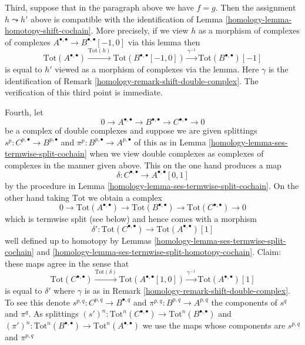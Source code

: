 \begin{remark}
\medskip\noindent
Third, suppose that in the paragraph above we have $f = g$.
Then the assignment $h \leadsto h'$ above is compatible with
the identification of Lemma \ref{homology-lemma-homotopy-shift-cochain}.
More precisely, if we view $h$ as a morphism of complexes
of complexes $A^{\bullet, \bullet} \to B^{\bullet, \bullet}[-1, 0]$
via this lemma then
$$
\text{Tot}(A^{\bullet, \bullet})
\xrightarrow{\text{Tot}(h)}
\text{Tot}(B^{\bullet, \bullet}[-1, 0])
\xrightarrow{\gamma^{-1}}
\text{Tot}(B^{\bullet, \bullet})[-1]
$$
is equal to $h'$ viewed as a morphism of complexes via the lemma.
Here $\gamma$ is the identification of
Remark \ref{homology-remark-shift-double-complex}.
The verification of this third point is immediate.

\medskip\noindent
Fourth, let
$$
0 \to A^{\bullet, \bullet} \to B^{\bullet, \bullet} \to
C^{\bullet, \bullet} \to 0
$$
be a complex of double complexes and suppose we are given splittings
$s^p : C^{p, \bullet} \to B^{p, \bullet}$ and
$\pi^p : B^{p, \bullet} \to A^{p, \bullet}$
of this as in Lemma \ref{homology-lemma-ses-termwise-split-cochain}
when we view double complexes
as complexes of complexes in the manner given above.
This on the one hand produces a map
$$
\delta : C^{\bullet, \bullet} \longrightarrow A^{\bullet, \bullet}[0, 1]
$$
by the procedure in Lemma \ref{homology-lemma-ses-termwise-split-cochain}.
On the other hand taking $\text{Tot}$ we obtain a complex
$$
0 \to \text{Tot}(A^{\bullet, \bullet}) \to
\text{Tot}(B^{\bullet, \bullet}) \to
\text{Tot}(C^{\bullet, \bullet}) \to 0
$$
which is termwise split (see below) and hence comes with a morphism
$$
\delta' :
\text{Tot}(C^{\bullet, \bullet})
\longrightarrow
\text{Tot}(A^{\bullet, \bullet})[1]
$$
well defined up to homotopy by Lemmas \ref{homology-lemma-ses-termwise-split-cochain}
and \ref{homology-lemma-ses-termwise-split-homotopy-cochain}. Claim:
these maps agree in the sense that
$$
\text{Tot}(C^{\bullet, \bullet})
\xrightarrow{\text{Tot}(\delta)}
\text{Tot}(A^{\bullet, \bullet}[1, 0]) \xrightarrow{\gamma^{-1}}
\text{Tot}(A^{\bullet, \bullet})[1]
$$
is equal to $\delta'$ where $\gamma$ is as in
Remark \ref{homology-remark-shift-double-complex}. To see this denote
$s^{p, q} : C^{p, q} \to B^{\bullet, q}$ and
$\pi^{p, q} : B^{p, q} \to A^{p, q}$ the components of $s^q$ and $\pi^q$.
As splittings
$(s')^n : \text{Tot}^n(C^{\bullet, \bullet}) \to
\text{Tot}^n(B^{\bullet, \bullet})$
and
$(\pi')^n : \text{Tot}^n(B^{\bullet, \bullet}) \to
\text{Tot}^n(A^{\bullet, \bullet})$
we use the maps whose components are $s^{p, q}$ and $\pi^{p, q}$

\end{remark}
